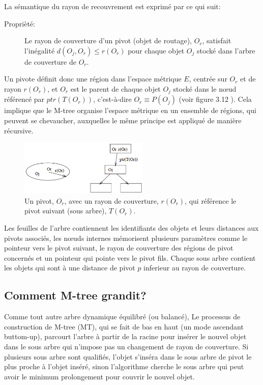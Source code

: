 La sémantique du rayon de recouvrement est exprimé par ce qui suit:
\begin{description}
	\item[Proprièté:] Le rayon de couverture d'un pivot (objet de routage), $ O_r $, satisfait l'inégalité $ d(O_j, O_r) \le r(O_r) $ pour chaque objet $ O_j $ stocké dans l'arbre de couverture de $ O_r $.
\end{description}

Un pivote définit donc une région dans l'espace métrique $ E $, centrée sur $ O_r $ et de rayon $ r(O_r) $, et $ O_r $ est le parent de chaque objet $ O_j $ stocké dans le nœud référencé par $ ptr(T(O_r)) $, c'est-à-dire $ O_r \equiv P(O_j)$ (voir figure 3.12 ).  Cela implique que le M-tree organise l'espace métrique en un ensemble de régions, qui peuvent se chevaucher, auxquelles le même principe est appliqué de manière récursive.

\begin{figure}[H]
	\centering
	\includegraphics[width=0.55\textwidth]{Figures/mtree.png} %
	\caption{ Un pivot, $ O_r $, avec un rayon de couverture, $  r(O_r) $, qui référence le pivot suivant (sous arbre), $ T(O_r) $.}
\end{figure}

Les feuilles de l’arbre contiennent les identifiants des objets et leurs distances aux pivots associés, les nœuds internes mémorisent plusieurs paramètres comme le pointeur vers le pivot suivant, le rayon de couverture des régions de pivot concernés et un pointeur qui pointe vers le pivot fils. Chaque sous arbre contient les objets qui sont à une distance de pivot $ p $ inferieur au rayon de couverture.\\

\subsection{Comment M-tree grandit?}

Comme tout autre arbre dynamique équilibré (ou balancé), Le processus de construction de M-tree (MT), qui se fait de bas en haut (un mode ascendant buttom-up), parcourt l'arbre à partir de la racine pour insérer le nouvel objet dans le sous arbre qui n'impose pas un changement de rayon de couverture. Si plusieurs sous arbre sont qualifiés, l'objet s'inséra dans le sous arbre de pivot le plus proche à l'objet inséré, sinon l'algorithme cherche le sous arbre qui peut avoir le minimum prolongement pour couvrir le nouvel objet.\\

